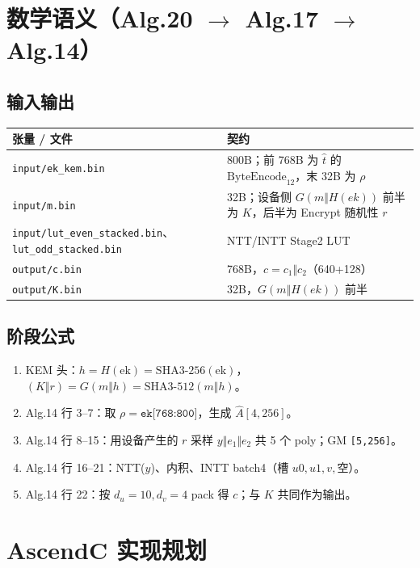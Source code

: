 \documentclass[UTF8,a4paper,11pt]{ctexart}
\begin{document}
\section{数学语义（Alg.20 $\to$ Alg.17 $\to$ Alg.14）}

\subsection{输入输出}

\begin{longtable}{@{}L{3.5cm}L{9.8cm}@{}}
\toprule
张量 / 文件 & 契约 \\
\midrule
\texttt{input/ek\_kem.bin} & 800B；前 768B 为 \(\hat t\) 的 \(\mathrm{ByteEncode}_{12}\)，末 32B 为 \(\rho\) \\
\texttt{input/m.bin} & 32B；设备侧 $G(m\Vert H(ek))$ 前半为 $K$，后半为 Encrypt 随机性 $r$ \\
\texttt{input/lut\_even\_stacked.bin}、\texttt{lut\_odd\_stacked.bin} & NTT/INTT Stage2 LUT \\
\texttt{output/c.bin} & 768B，\(c=c_1\Vert c_2\)（640+128） \\
\texttt{output/K.bin} & 32B，\(G(m\Vert H(ek))\) 前半 \\
\bottomrule
\end{longtable}

\subsection{阶段公式}

\begin{enumerate}
  \item KEM 头：$h=H(\mathrm{ek})=\mathrm{SHA3\textrm{-}256}(\mathrm{ek})$，$(K\Vert r)=G(m\Vert h)=\mathrm{SHA3\textrm{-}512}(m\Vert h)$。
  \item Alg.14 行 3--7：取 \(\rho=\texttt{ek[768:800]}\)，生成 \(\hat A[4,256]\)。
  \item Alg.14 行 8--15：用设备产生的 \(r\) 采样 \(y\Vert e_1\Vert e_2\) 共 5 个 poly；GM \texttt{[5,256]}。
  \item Alg.14 行 16--21：NTT(\(y\))、内积、INTT batch4（槽 \(u0,u1,v,\)空）。
  \item Alg.14 行 22：按 \(d_u=10,d_v=4\) pack 得 \(c\)；与 $K$ 共同作为输出。
\end{enumerate}

\section{AscendC 实现规划}
\end{document}
